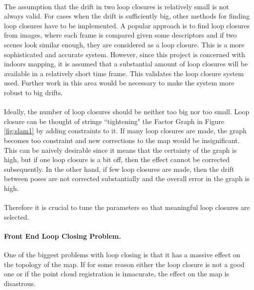 \documentclass[12pt]{article}
\begin{document}
	\paragraph{}
	The assumption that the drift in two loop closures is relatively small is not always valid. For cases when the drift is sufficiently big, other methods for finding loop closures have to be implemented. A popular approach is to find loop closures from images, where each frame is compared given some descriptors and if two scenes look similar enough, they are considered as a loop closure. This is a more sophisticated and accurate system. However, since this project is concerned with indoors mapping, it is assumed that a substantial amount of loop closures will be available in a relatively short time frame. This validates the loop closure system used. Further work in this area would be necessary to make the system more robust to big drifts.	
	
	\paragraph{}
	Ideally, the number of loop closures should be neither too big nor too small. Loop closure can be thought of strings ``tightening" the Factor Graph in Figure \ref{fig:slam1} by adding constraints to it. If many loop closures are made, the graph becomes too constraint and new corrections to the map would be insignificant. This can be naively desirable since it means that the certainty of the graph is high, but if one loop closure is a bit off, then the effect cannot be corrected subsequently. In the other hand, if few loop closures are made, then the drift between poses are not corrected substantially and the overall error in the graph is high.
	
	\paragraph{}
	Therefore it is crucial to tune the parameters so that meaningful loop closures are selected. 

	\paragraph{Front End Loop Closing Problem.} One of the biggest problems with loop closing is that it has a massive effect on the topology of the map. If for some reason either the loop closure is not a good one or if the point cloud registration is innacurate, the effect on the map is disastrous.
	
\end{document}
